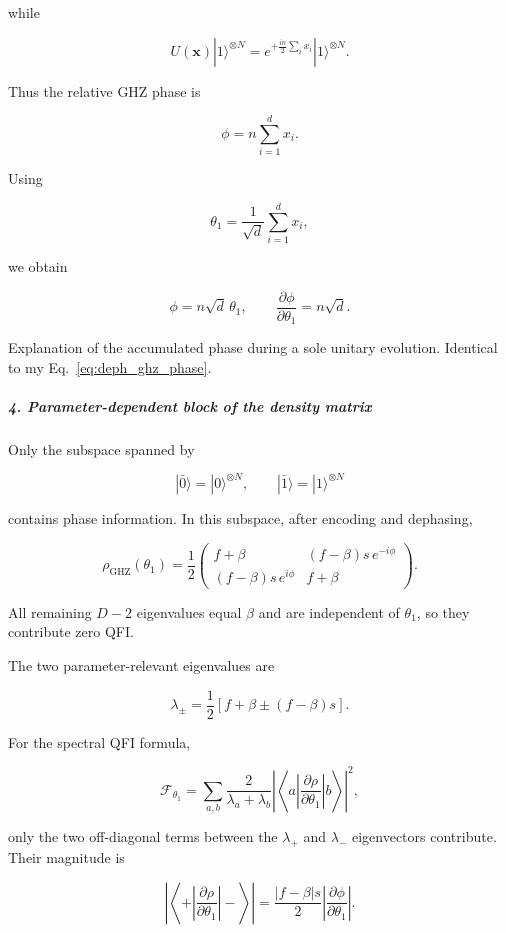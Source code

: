 while

\[
U(\boldsymbol{x})|1\rangle^{\otimes N} = e^{+\frac{in}{2}\sum_i x_i}|1\rangle^{\otimes N}.
\]

Thus the relative GHZ phase is

\[
\phi=n\sum_{i=1}^{d}x_i.
\]

Using

\[
\theta_1=\frac{1}{\sqrt d}\sum_{i=1}^{d}x_i,
\]

we obtain

\[
\phi=n\sqrt d\,\theta_1, \qquad \frac{\partial\phi}{\partial\theta_1}=n\sqrt d.
\]

{\color{blue}

Explanation of the accumulated phase during a sole unitary evolution. Identical to my Eq.~\eqref{eq:deph_ghz_phase}.

}

\subparagraph*{4. Parameter-dependent block of the density matrix}

Only the subspace spanned by

\[
|\bar0\rangle=|0\rangle^{\otimes N}, \qquad |\bar1\rangle=|1\rangle^{\otimes N}
\]

contains phase information. In this subspace, after encoding and dephasing,

\[
\rho_{\mathrm{GHZ}}(\theta_1)
=
\frac12
\begin{pmatrix}
f+\beta &
(f-\beta)s\,e^{-i\phi}\\[2mm]
(f-\beta)s\,e^{i\phi} &
f+\beta
\end{pmatrix}.
\]

All remaining $D-2$ eigenvalues equal $\beta$ and are independent of $\theta_1$, so they contribute zero QFI.

The two parameter-relevant eigenvalues are

\[
\lambda_\pm = \frac12\left[ f+\beta\pm(f-\beta)s \right].
\]

For the spectral QFI formula,

\[
\mathcal F_{\theta_1} = \sum_{a,b} \frac{2}{\lambda_a+\lambda_b} \left| \left\langle a\left| \frac{\partial\rho}{\partial\theta_1} \right|b\right\rangle \right|^2,
\]

only the two off-diagonal terms between the $\lambda_+$ and $\lambda_-$ eigenvectors contribute. Their magnitude is

\[
\left| \left\langle +\left| \frac{\partial\rho}{\partial\theta_1} \right|-\right\rangle \right| = \frac{|f-\beta|s}{2} \left|\frac{\partial\phi}{\partial\theta_1}\right|.
\]

